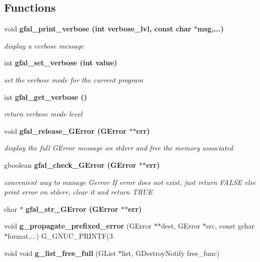 \subsection*{Functions}
\begin{CompactItemize}
\item 
void \bf{gfal\_\-print\_\-verbose} (int verbose\_\-lvl, const char $\ast$msg,...)
\begin{CompactList}\small\item\em display a verbose message \item\end{CompactList}\item 
int \bf{gfal\_\-set\_\-verbose} (int value)
\begin{CompactList}\small\item\em set the verbose mode for the current program \item\end{CompactList}\item 
int \bf{gfal\_\-get\_\-verbose} ()\label{gfal__common__errverbose_8h_135b3fdd775aa7215e2ab4de1eea495f}

\begin{CompactList}\small\item\em return verbose mode level \item\end{CompactList}\item 
void \bf{gfal\_\-release\_\-GError} (GError $\ast$$\ast$err)\label{gfal__common__errverbose_8h_1441ea4b8176eb0cf3099009b950a3e9}

\begin{CompactList}\small\item\em display the full GError message on stderr and free the memory associated \item\end{CompactList}\item 
gboolean \bf{gfal\_\-check\_\-GError} (GError $\ast$$\ast$err)\label{gfal__common__errverbose_8h_9167aee5bda42b71a982f863e88f7bfd}

\begin{CompactList}\small\item\em convenient way to manage Gerror If error does not exist, just return FALSE else print error on stderr, clear it and return TRUE \item\end{CompactList}\item 
char $\ast$ \bf{gfal\_\-str\_\-GError} (GError $\ast$$\ast$err)
\item 
void \textbf{g\_\-propagate\_\-prefixed\_\-error} (GError $\ast$$\ast$dest, GError $\ast$src, const gchar $\ast$format,...) G\_\-GNUC\_\-PRINTF(3\label{gfal__common__errverbose_8h_f9695e2ac1722715b687c1818cb2993d}

\item 
void void \textbf{g\_\-list\_\-free\_\-full} (GList $\ast$list, GDestroy\-Notify free\_\-func)\label{gfal__common__errverbose_8h_5281973fe37b3ad6848d8a4d967cc762}

\end{CompactItemize}
